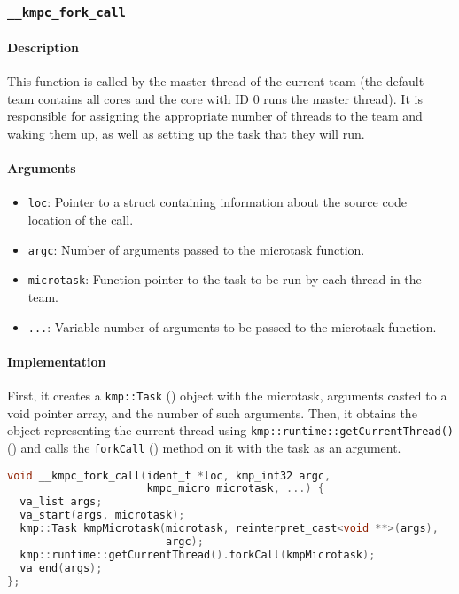 \subsubsection{\texttt{\_\_kmpc\_fork\_call}}
\label{subsubsec:kmpc-fork-call}

\paragraph{Description} This function is called by the master thread of the current team (the
default team contains all cores and the core with ID 0 runs the master thread). It is responsible
for assigning the appropriate number of threads to the team and waking them up, as well as setting
up the task that they will run.

\paragraph{Arguments}
\begin{itemize}
	\item \texttt{loc}: Pointer to a struct containing information about the source code location
	      of the call.
	\item \texttt{argc}: Number of arguments passed to the microtask function.
	\item \texttt{microtask}: Function pointer to the task to be run by each thread in the team.
	\item \texttt{...}: Variable number of arguments to be passed to the microtask function.
\end{itemize}

\paragraph{Implementation} First, it creates a \texttt{kmp::Task} () object with the
microtask, arguments casted to a void pointer array, and the number of such arguments. Then, it
obtains the object representing the current thread using \texttt{kmp::runtime::getCurrentThread()}
() and calls the \texttt{forkCall} () method on it with the task as an argument.

\begin{lstlisting}[language=C, caption={\_\_kmpc\_fork\_call}, label={lst:fork-call},
                   escapechar=@]
void __kmpc_fork_call(ident_t *loc, kmp_int32 argc,
                      kmpc_micro microtask, ...) {
  va_list args;
  va_start(args, microtask);
  kmp::Task kmpMicrotask(microtask, reinterpret_cast<void **>(args),
                         argc);
  kmp::runtime::getCurrentThread().forkCall(kmpMicrotask);
  va_end(args);
};
\end{lstlisting}

